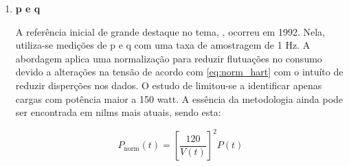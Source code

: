 \begin{enumerate}[label=\textbf{1.\arabic*},wide=\parindent]
\item \textbf{\Acrlong{p} e \Acrlong{q}}
\label{nilm:pot_real_reat}

\indent A referência inicial de grande destaque no tema,
\citet*{nilm_hart_1992_8}, ocorreu em 1992. Nela, utiliza-se medições de
\gls{p} e \gls{q} com uma taxa de amostragem de 1 Hz. A abordagem
aplica uma normalização para reduzir flutuações no consumo devido a
alterações na tensão de acordo com \ref{eq:norm_hart} com o intuíto de
reduzir disperções nos dados. O estudo de \citeauthor*{nilm_hart_1992_8}
limitou-se a identificar apenas cargas com potência maior a 150
\acrshort{watt}. A essência da metodologia ainda pode ser encontrada
em \glspl{nilm} mais atuais, sendo esta: 

\begin{equation} \label{eq:norm_hart}
P_{\text{norm}}(t) = \left[ \frac{120}{V(t)} \right]^2 P(t)
\end{equation}


\end{enumerate}
